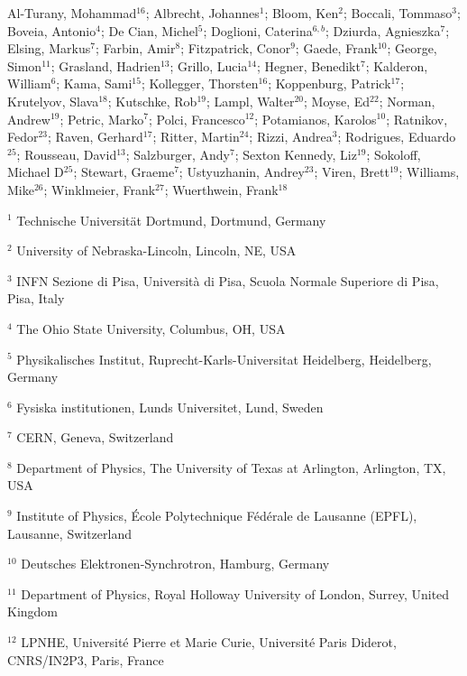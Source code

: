 Al-Turany, Mohammad$^{16}$;
Albrecht, Johannes$^{1}$;
Bloom, Ken$^{2}$;
Boccali, Tommaso$^{3}$;
Boveia, Antonio$^{4}$;
De Cian, Michel$^{5}$;
Doglioni, Caterina$^{6,b}$;
Dziurda, Agnieszka$^{7}$;
Elsing, Markus$^{7}$;
Farbin, Amir$^{8}$;
Fitzpatrick, Conor$^{9}$;
Gaede, Frank$^{10}$;
George, Simon$^{11}$;
Grasland, Hadrien$^{13}$;
Grillo, Lucia$^{14}$;
Hegner, Benedikt$^{7}$;
Kalderon, William$^{6}$;
Kama, Sami$^{15}$;
Kollegger, Thorsten$^{16}$;
Koppenburg, Patrick$^{17}$;
Krutelyov, Slava$^{18}$;
Kutschke, Rob$^{19}$;
Lampl, Walter$^{20}$;
Moyse, Ed$^{22}$;
Norman, Andrew$^{19}$;
Petric, Marko$^{7}$;
Polci, Francesco$^{12}$;
Potamianos, Karolos$^{10}$;
Ratnikov, Fedor$^{23}$;
Raven, Gerhard$^{17}$;
Ritter, Martin$^{24}$;
Rizzi, Andrea$^{3}$;
Rodrigues, Eduardo$^{25}$;
Rousseau, David$^{13}$;
Salzburger, Andy$^{7}$;
Sexton Kennedy, Liz$^{19}$;
Sokoloff, Michael D$^{25}$;
Stewart, Graeme$^{7}$;
Ustyuzhanin, Andrey$^{23}$;
Viren, Brett$^{19}$;
Williams, Mike$^{26}$;
Winklmeier, Frank$^{27}$;
Wuerthwein, Frank$^{18}$
\bigskip 
\par {\footnotesize $^{1}$ Technische Universit\"at Dortmund, Dortmund, Germany}
\par {\footnotesize $^{2}$ University of Nebraska-Lincoln, Lincoln, NE, USA}
\par {\footnotesize $^{3}$ INFN Sezione di Pisa, Università di Pisa, Scuola Normale Superiore di Pisa, Pisa, Italy}
\par {\footnotesize $^{4}$ The Ohio State University, Columbus, OH, USA}
\par {\footnotesize $^{5}$ Physikalisches Institut, Ruprecht-Karls-Universitat Heidelberg, Heidelberg, Germany}
\par {\footnotesize $^{6}$ Fysiska institutionen, Lunds Universitet, Lund, Sweden}
\par {\footnotesize $^{7}$ CERN, Geneva, Switzerland}
\par {\footnotesize $^{8}$ Department of Physics, The University of Texas at Arlington, Arlington, TX, USA}
\par {\footnotesize $^{9}$ Institute of Physics, École Polytechnique Fédérale de Lausanne (EPFL), Lausanne, Switzerland}
\par {\footnotesize $^{10}$ Deutsches Elektronen-Synchrotron, Hamburg, Germany}
\par {\footnotesize $^{11}$ Department of Physics, Royal Holloway University of London, Surrey, United Kingdom}
\par {\footnotesize $^{12}$ LPNHE, Université Pierre et Marie Curie, Université Paris Diderot, CNRS/IN2P3, Paris, France}
